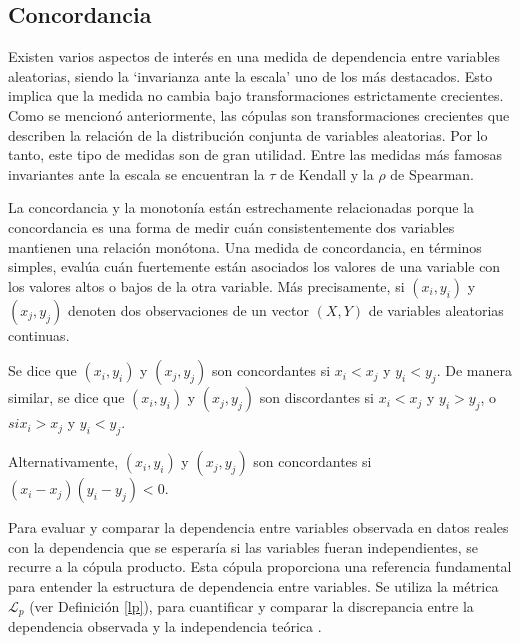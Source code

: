 
\subsection{Concordancia}

Existen varios aspectos de interés en una medida de dependencia entre variables aleatorias, siendo la `invarianza ante la escala' uno de los más destacados. Esto implica que la medida no cambia bajo transformaciones estrictamente crecientes. Como se mencionó anteriormente, las cópulas son transformaciones crecientes que describen la relación de la distribución conjunta de variables aleatorias. Por lo tanto, este tipo de medidas son de gran utilidad. Entre las medidas más famosas invariantes ante la escala se encuentran la $\tau$ de Kendall y la $\rho$ de Spearman.\cite{czadoAnalyzing}

La concordancia y la monotonía están estrechamente relacionadas porque la concordancia es una forma de medir cuán consistentemente dos variables mantienen una relación monótona. Una medida de concordancia, en términos simples, evalúa cuán fuertemente están asociados los valores de una variable con los valores altos o bajos de la otra variable. Más precisamente, si $(x_i, y_i)$ y $(x_j, y_j)$ denoten dos observaciones de un vector $(X, Y)$ de variables aleatorias continuas. 

\begin{defn}[Concordancia]
    Se dice que $(x_i, y_i)$ y $(x_j, y_j)$ son concordantes si $x_i < x_j$ y $y_i < y_j$. De manera similar, se dice que $(x_i, y_i)$ y $(x_j, y_j)$ son discordantes si $x_i < x_j$ y $y_i > y_j$, o $si x_i > x_j$ y $y_i < y_j$. 
    
    Alternativamente, $(x_i, y_i)$ y $(x_j, y_j)$ son concordantes si $(x_i - x_j)(y_i - y_j) < 0$.
\end{defn}

Para evaluar y comparar la dependencia entre variables observada en datos reales con la dependencia que se esperaría si las variables fueran independientes, se recurre a la cópula producto. Esta cópula proporciona una referencia fundamental para entender la estructura de dependencia entre variables. Se utiliza la métrica $\mathcal{L}_p$ (ver Definición \ref{lp}), para cuantificar y comparar la discrepancia entre la dependencia observada y la independencia teórica \cite{TesisEmanuel}.

